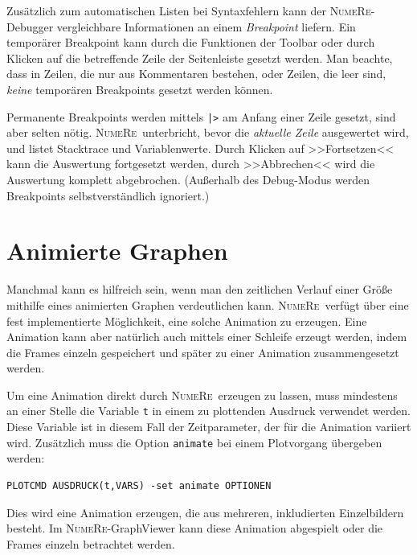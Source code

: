 \documentclass[DIV=14,headsepline,footsepline]{scrbook}
\newcommand{\NR}{\textsc{Nu\-me\-Re}}
\begin{document}
				Zusätzlich zum automatischen Listen bei Syntaxfehlern kann der \NR-Debugger vergleichbare Informationen an einem \emph{Breakpoint} liefern. Ein temporärer Breakpoint kann durch die Funktionen der Toolbar oder durch Klicken auf die betreffende Zeile der Seitenleiste gesetzt werden. Man beachte, dass in Zeilen, die nur aus Kommentaren bestehen, oder Zeilen, die leer sind, \emph{keine} temporären Breakpoints gesetzt werden können. 
				
				Permanente Breakpoints werden mittels \verb+|>+ am Anfang einer Zeile gesetzt, sind aber selten nötig. \NR\ unterbricht, bevor die \emph{aktuelle Zeile} ausgewertet wird, und listet Stacktrace und Variablenwerte. Durch Klicken auf >>Fortsetzen<< kann die Auswertung fortgesetzt werden, durch >>Abbrechen<< wird die Auswertung komplett abgebrochen. (Außerhalb des Debug-Modus werden Breakpoints selbstverständlich ignoriert.)
				
		\chapter{Animierte Graphen}
			Manchmal kann es hilfreich sein, wenn man den zeitlichen Verlauf einer Größe mithilfe eines animierten Graphen verdeutlichen kann. \NR\ verfügt über eine fest implementierte Möglichkeit, eine solche Animation zu erzeugen. Eine Animation kann aber natürlich auch mittels einer Schleife erzeugt werden, indem die Frames einzeln gespeichert und später zu einer Animation zusammengesetzt werden.
			
			Um eine Animation direkt durch \NR\ erzeugen zu lassen, muss mindestens an einer Stelle die Variable \verb+t+ in einem zu plottenden Ausdruck verwendet werden. Diese Variable ist in diesem Fall der Zeitparameter, der für die Animation variiert wird. Zusätzlich muss die Option \verb+animate+ bei einem Plotvorgang übergeben werden:
			\begin{lstlisting}
PLOTCMD AUSDRUCK(t,VARS) -set animate OPTIONEN
			\end{lstlisting}
			Dies wird eine Animation erzeugen, die aus mehreren, inkludierten Einzelbildern besteht. Im \NR-GraphViewer kann diese Animation abgespielt oder die Frames einzeln betrachtet werden.
			
\end{document}
